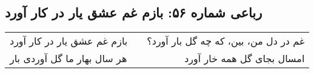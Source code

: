 \begin{center}
\section*{رباعی شماره ۵۶: بازم غم عشق یار در کار آورد}
\label{sec:056}
\begin{longtable}{l p{0.5cm} r}
بازم غم عشق یار در کار آورد
&&
غم در دل من، بین، که چه گل بار آورد؟
\\
هر سال بهار ما گل آوردی بار
&&
امسال بجای گل همه خار آورد
\\
\end{longtable}
\end{center}
